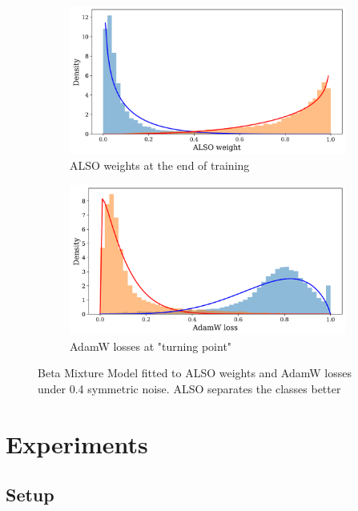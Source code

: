 \documentclass[12pt]{article}
\begin{document}
\begin{figure}[htbp]
  \centering
  \begin{subfigure}[b]{0.45\textwidth}
    \centering
    \includegraphics[width=\textwidth]{figures/minmin_weights.png}
    \caption{ALSO weights at the end of training}
    \label{fig:sub1}
  \end{subfigure}
  \hfill
  \begin{subfigure}[b]{0.45\textwidth}
    \centering
    \includegraphics[width=\textwidth]{figures/adamw_losses.png}
    \caption{AdamW losses at "turning point"}
    \label{fig:sub2}
  \end{subfigure}
  \caption{Beta Mixture Model fitted to ALSO weights and AdamW losses under 0.4 symmetric noise. ALSO separates the classes better}
  \label{fig:loss_model}
\end{figure}

\section{Experiments}

\subsection{Setup}
\end{document}
